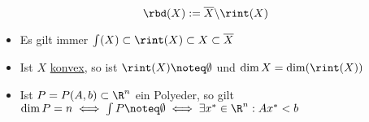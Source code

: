 \begin{itemize}
		\begin{equation*}
			\rbd(X) := \overline{X}\backslash \rint(X)
		\end{equation*}
	\begin{bemerkung}
		\begin{itemize}
			\item Es gilt immer $\int(X)\subset \rint(X) \subset X \subset \overline{X}$
			\item Ist $X$ \underline{konvex}, so ist $\rint(X)\noteq \emptyset$ und $\dim X= \dim(\rint(X))$
			\item Ist  $P = P(A,b) \subset \R^n$ ein Polyeder, so gilt $\dim P=n \iff \int P \noteq \emptyset \iff \exists x^* \in \R^n: Ax^*<b$
		\end{itemize}
	\end{bemerkung}
\end{itemize}
